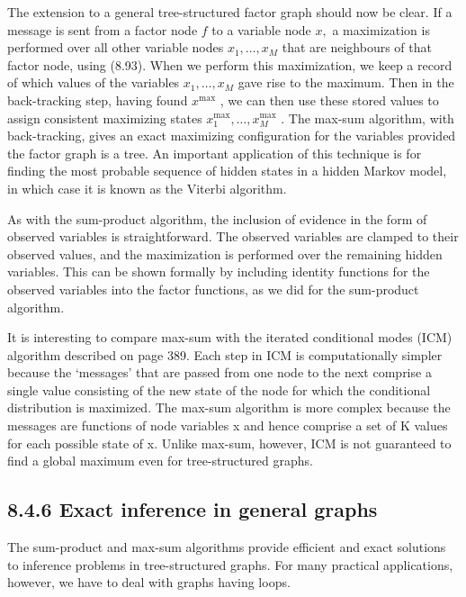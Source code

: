 \documentclass[
  10
]{article}
\begin{document}
The extension to a general tree-structured factor graph should now be
clear. If a message is sent from a factor node \(f\) to a variable node
\(x ,\) a maximization is performed over all other variable nodes
\(x _ { 1 } , \ldots , x _ { M }\) that are neighbours of that factor
node, using (8.93). When we perform this maximization, we keep a record
of which values of the variables \(x _ { 1 } , \ldots , x _ { M }\) gave
rise to the maximum. Then in the back-tracking step, having found
\(x ^ { \mathrm { m a x } }\) , we can then use these stored values to
assign consistent maximizing states
\(x _ { 1 } ^ { \mathrm { m a x } } , \ldots , x _ { M } ^ { \mathrm { m a x } }\)
. The max-sum algorithm, with back-tracking, gives an exact maximizing
configuration for the variables provided the factor graph is a tree. An
important application of this technique is for finding the most probable
sequence of hidden states in a hidden Markov model, in which case it is
known as the Viterbi algorithm.

As with the sum-product algorithm, the inclusion of evidence in the form
of observed variables is straightforward. The observed variables are
clamped to their observed values, and the maximization is performed over
the remaining hidden variables. This can be shown formally by including
identity functions for the observed variables into the factor functions,
as we did for the sum-product algorithm.

It is interesting to compare max-sum with the iterated conditional modes
(ICM) algorithm described on page 389. Each step in ICM is
computationally simpler because the `messages' that are passed from one
node to the next comprise a single value consisting of the new state of
the node for which the conditional distribution is maximized. The
max-sum algorithm is more complex because the messages are functions of
node variables x and hence comprise a set of K values for each possible
state of x. Unlike max-sum, however, ICM is not guaranteed to find a
global maximum even for tree-structured graphs.

\subsection{8.4.6 Exact inference in general
graphs}\label{exact-inference-in-general-graphs}

The sum-product and max-sum algorithms provide efficient and exact
solutions to inference problems in tree-structured graphs. For many
practical applications, however, we have to deal with graphs having
loops.
\end{document}
